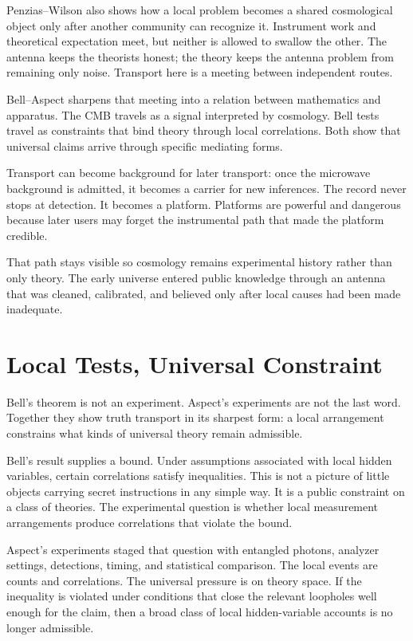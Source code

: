 Penzias--Wilson also shows how a local problem becomes a shared cosmological
object only after another community can recognize it. Instrument work and
theoretical expectation meet, but neither is allowed to swallow the other. The
antenna keeps the theorists honest; the theory keeps the antenna problem from
remaining only noise. Transport here is a meeting between independent routes.

Bell--Aspect sharpens that meeting into a relation between mathematics and
apparatus. The CMB travels as a signal interpreted by cosmology. Bell tests
travel as constraints that bind theory through local correlations. Both show
that universal claims arrive through specific mediating forms.

Transport can become background for later transport: once the microwave
background is admitted, it becomes a carrier for new inferences. The
record never stops at detection. It becomes a platform. Platforms are
powerful and dangerous because later users may forget the instrumental
path that made the platform credible.

That path stays visible so cosmology remains experimental history rather
than only theory. The early universe entered public knowledge through an
antenna that was cleaned, calibrated, and believed only after local
causes had been made inadequate.

\section{Local Tests, Universal Constraint}

Bell's theorem is not an experiment. Aspect's experiments are not the last
word. Together they show truth transport in its sharpest form: a local
arrangement constrains what kinds of universal theory remain admissible.

Bell's result supplies a bound. Under assumptions associated with local
hidden variables, certain correlations satisfy inequalities. This is not a
picture of little objects carrying secret instructions in any simple way.
It is a public constraint on a class of theories. The experimental
question is whether local measurement arrangements produce correlations
that violate the bound.

Aspect's experiments staged that question with entangled photons, analyzer
settings, detections, timing, and statistical comparison. The local events
are counts and correlations. The universal pressure is on theory space.
If the inequality is violated under conditions that close the relevant
loopholes well enough for the claim, then a broad class of local
hidden-variable accounts is no longer admissible.

